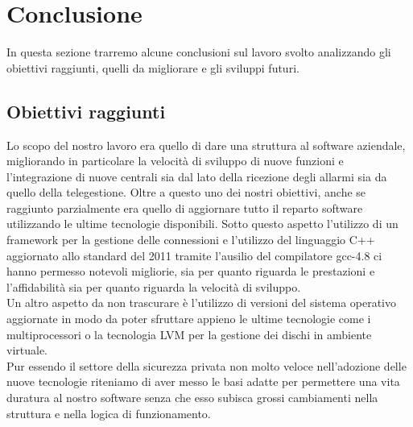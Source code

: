 \chapter{Conclusione}
\label{capitolo8}
\thispagestyle{empty}
In questa sezione trarremo alcune conclusioni sul lavoro svolto analizzando gli obiettivi raggiunti, quelli da migliorare e gli sviluppi futuri.
\section{Obiettivi raggiunti}
Lo scopo del nostro lavoro era quello di dare una struttura al software aziendale, migliorando in particolare la velocità di sviluppo di nuove funzioni e l'integrazione di nuove centrali sia dal lato della ricezione degli allarmi sia da quello della telegestione. Oltre a questo uno dei nostri obiettivi, anche se raggiunto parzialmente era quello di aggiornare tutto il reparto software utilizzando le ultime tecnologie disponibili. Sotto questo aspetto l'utilizzo di un framework per la gestione delle connessioni e l'utilizzo del linguaggio C++ aggiornato allo standard del 2011 tramite l'ausilio del compilatore gcc-4.8 ci hanno permesso notevoli migliorie, sia per quanto riguarda le prestazioni e l'affidabilità sia per quanto riguarda la velocità di sviluppo.\\
Un altro aspetto da non trascurare è l'utilizzo di versioni del sistema operativo aggiornate in modo da poter sfruttare appieno le ultime tecnologie come i multiprocessori o la tecnologia LVM per la gestione dei dischi in ambiente virtuale.\\
Pur essendo il settore della sicurezza privata non molto veloce nell'adozione delle nuove tecnologie riteniamo di aver messo le basi adatte per permettere una vita duratura al nostro software senza che esso subisca grossi cambiamenti nella struttura e nella logica di funzionamento.
